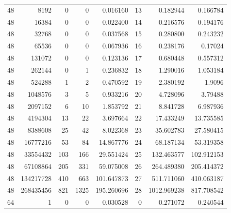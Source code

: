 \begin{longtable}[c]{@{}rrrrrrrr@{}}
    48        & 8192      & 0         & 0        & 0.016160    & 13                  & 0.182944    & 0.166784   \\
    48        & 16384     & 0         & 0        & 0.022400    & 14                  & 0.216576    & 0.194176   \\
    48        & 32768     & 0         & 0        & 0.037568    & 15                  & 0.280800    & 0.243232   \\
    48        & 65536     & 0         & 0        & 0.067936    & 16                  & 0.238176    & 0.17024    \\
    48        & 131072    & 0         & 0        & 0.123136    & 17                  & 0.680448    & 0.557312   \\
    48        & 262144    & 0         & 1        & 0.236832    & 18                  & 1.290016    & 1.053184   \\
    48        & 524288    & 1         & 2        & 0.470592    & 19                  & 2.380192    & 1.9096     \\
    48        & 1048576   & 3         & 5        & 0.933216    & 20                  & 4.728096    & 3.79488    \\
    48        & 2097152   & 6         & 10       & 1.853792    & 21                  & 8.841728    & 6.987936   \\
    48        & 4194304   & 13        & 22       & 3.697664    & 22                  & 17.433249   & 13.735585  \\
    48        & 8388608   & 25        & 42       & 8.022368    & 23                  & 35.602783   & 27.580415  \\
    48        & 16777216  & 53        & 84       & 14.867776   & 24                  & 68.187134   & 53.319358  \\
    48        & 33554432  & 103       & 166      & 29.551424   & 25                  & 132.463577  & 102.912153 \\
    48        & 67108864  & 205       & 331      & 59.075008   & 26                  & 264.489380  & 205.414372 \\
    48        & 134217728 & 410       & 663      & 101.647873  & 27                  & 511.711060  & 410.063187 \\
    48        & 268435456 & 821       & 1325     & 195.260696  & 28                  & 1012.969238 & 817.708542 \\
    64        & 1         & 0         & 0        & 0.030528    & 0                   & 0.271072    & 0.240544   \\

\end{longtable}
